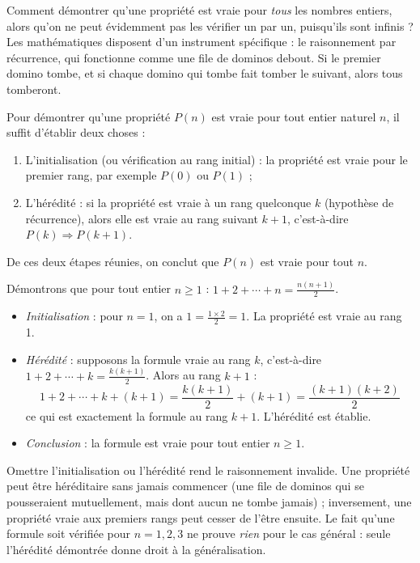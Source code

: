 \documentclass[11pt]{article}
\newcommand{\cle}[1]{{\popxbold\color{popdark}#1}}
\begin{document}
Comment démontrer qu'une propriété est vraie pour \emph{tous} les nombres entiers, alors qu'on ne peut évidemment pas les vérifier un par un, puisqu'ils sont infinis ? Les mathématiques disposent d'un instrument spécifique : le \cle{raisonnement par récurrence}, qui fonctionne comme une file de dominos debout. Si le premier domino tombe, et si chaque domino qui tombe fait tomber le suivant, alors tous tomberont.

\begin{definition}
Pour démontrer qu'une propriété $P(n)$ est vraie pour tout entier naturel $n$, il suffit d'établir deux choses :
\begin{enumerate}
\item \cle{L'initialisation} (ou vérification au rang initial) : la propriété est vraie pour le premier rang, par exemple $P(0)$ ou $P(1)$ ;
\item \cle{L'hérédité} : si la propriété est vraie à un rang quelconque $k$ (hypothèse de récurrence), alors elle est vraie au rang suivant $k+1$, c'est-à-dire $P(k) \Rightarrow P(k+1)$.
\end{enumerate}
De ces deux étapes réunies, on conclut que $P(n)$ est vraie pour tout $n$.
\end{definition}

\begin{exemplebox}
Démontrons que pour tout entier $n \geq 1$ : $1 + 2 + \cdots + n = \frac{n(n+1)}{2}$.
\begin{itemize}
\item \emph{Initialisation} : pour $n = 1$, on a $1 = \frac{1 \times 2}{2} = 1$. La propriété est vraie au rang 1.
\item \emph{Hérédité} : supposons la formule vraie au rang $k$, c'est-à-dire $1 + 2 + \cdots + k = \frac{k(k+1)}{2}$. Alors au rang $k+1$ :
\[ 1 + 2 + \cdots + k + (k+1) = \frac{k(k+1)}{2} + (k+1) = \frac{(k+1)(k+2)}{2} \]
ce qui est exactement la formule au rang $k+1$. L'hérédité est établie.
\item \emph{Conclusion} : la formule est vraie pour tout entier $n \geq 1$.
\end{itemize}
\end{exemplebox}

\begin{attention}
Omettre l'initialisation ou l'hérédité rend le raisonnement invalide. Une propriété peut être héréditaire sans jamais commencer (une file de dominos qui se pousseraient mutuellement, mais dont aucun ne tombe jamais) ; inversement, une propriété vraie aux premiers rangs peut cesser de l'être ensuite. Le fait qu'une formule soit vérifiée pour $n = 1, 2, 3$ ne prouve \emph{rien} pour le cas général : seule l'hérédité démontrée donne droit à la généralisation.
\end{attention}
\end{document}
